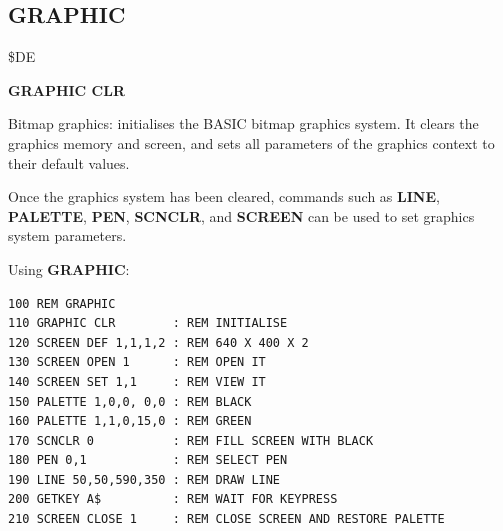 \subsection{GRAPHIC}
\begin{description}[leftmargin=2cm,style=nextline]
\item [Token:] \$DE
\item [Format:] {\bf GRAPHIC CLR}
\item [Usage:] Bitmap graphics: initialises the BASIC bitmap graphics system.
               It clears the graphics memory and screen, and sets
               all parameters of the graphics context to their
               default values.

               Once the graphics system has been cleared, commands such as {\bf LINE},
               {\bf PALETTE}, {\bf PEN}, {\bf SCNCLR}, and {\bf SCREEN} can be
               used to set graphics system parameters.

\item [Example:] Using {\bf GRAPHIC}:
\begin{tcolorbox}[colback=black,coltext=white]
\verbatimfont{\codefont}
\begin{verbatim}
100 REM GRAPHIC
110 GRAPHIC CLR        : REM INITIALISE
120 SCREEN DEF 1,1,1,2 : REM 640 X 400 X 2
130 SCREEN OPEN 1      : REM OPEN IT
140 SCREEN SET 1,1     : REM VIEW IT
150 PALETTE 1,0,0, 0,0 : REM BLACK
160 PALETTE 1,1,0,15,0 : REM GREEN
170 SCNCLR 0           : REM FILL SCREEN WITH BLACK
180 PEN 0,1            : REM SELECT PEN
190 LINE 50,50,590,350 : REM DRAW LINE
200 GETKEY A$          : REM WAIT FOR KEYPRESS
210 SCREEN CLOSE 1     : REM CLOSE SCREEN AND RESTORE PALETTE
\end{verbatim}
\end{tcolorbox}
\end{description}


\newpage
